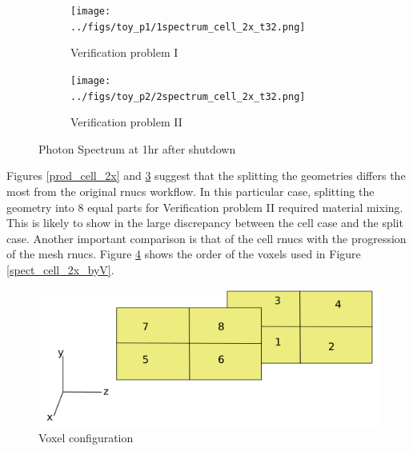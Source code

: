 \begin{figure}[h!]
 \begin{centering}
 \centering
 \begin{subfigure}[b]{.45\textwidth}
 \texttt{[image: ../figs/toy\_p1/1spectrum\_cell\_2x\_t32.png]}
 \caption{Verification problem I }
 \label{1spect_cell_2x}
 \end{subfigure}
 \hspace{0.05cm}
 \begin{subfigure}[b]{.45\textwidth}
 \centering
 \texttt{[image: ../figs/toy\_p2/2spectrum\_cell\_2x\_t32.png]}
 \caption{Verification problem II}
 \label{2spect_cell_2x}
 \end{subfigure}
 \caption{Photon Spectrum at 1hr after shutdown }
 \label{spect_cell_2x}
 \end{centering}
\end{figure}
Figures \ref{prod_cell_2x} and \ref{spect_cell_2x} suggest that the splitting the geometries 
differs the most from the original rnucs workflow. In this particular case, splitting the geometry 
into 8 equal parts for Verification problem II required material mixing.
This is likely to show in the large discrepancy between the cell case and the split case.
Another important comparison is that of the cell rnucs with the progression of the mesh rnucs. 
Figure \ref{voxels} shows the order of the voxels used in Figure \ref{spect_cell_2x_byV}. 


\begin{figure}[h]
\begin{centering}
\includegraphics[width=0.60\linewidth]{../figs/voxels.png}
\caption{Voxel configuration}
\label{voxels}
\end{centering}
\end{figure}

